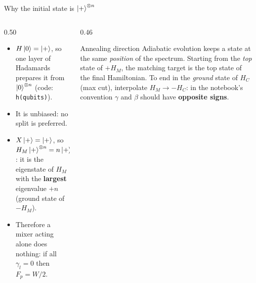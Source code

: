 \documentclass[aspectratio=169,11pt]{beamer}
\newcommand{\hl}[1]{{\color{qorange}\textbf{#1}}}
\newcommand{\key}[1]{{\color{qdark}\textbf{#1}}}
\begin{document}
\begin{frame}{Why the initial state is $\ket+^{\otimes n}$}
  \begin{columns}[T]
    \begin{column}{0.50\textwidth}
      \begin{itemize}
        \item $H\ket0 = \ket+$, so one layer of Hadamards prepares it from $\ket0^{\otimes n}$ (code: \texttt{h(qubits)}).
        \item It is unbiased: no split is preferred.
        \item $X\ket+ = \ket+$, so $H_M\ket+^{\otimes n} = n\ket+^{\otimes n}$: it is the eigenstate of $H_M$ with the
          \key{largest} eigenvalue $+n$ (ground state of $-H_M$).
        \item Therefore a mixer acting alone does nothing: if all $\gamma_l = 0$ then $F_p = W/2$.
      \end{itemize}
    \end{column}
    \begin{column}{0.46\textwidth}
      \begin{alertblock}{Annealing direction}
        Adiabatic evolution keeps a state at the same \emph{position} of the spectrum. Starting from the \emph{top} state of
        $+H_M$, the matching target is the top state of the final Hamiltonian. To end in the \emph{ground} state of $H_C$
        (max cut), interpolate $H_M \to -H_C$: in the notebook's convention $\gamma$ and $\beta$ should have
        \hl{opposite signs}.
      \end{alertblock}
    \end{column}
  \end{columns}
\end{frame}
\end{document}
